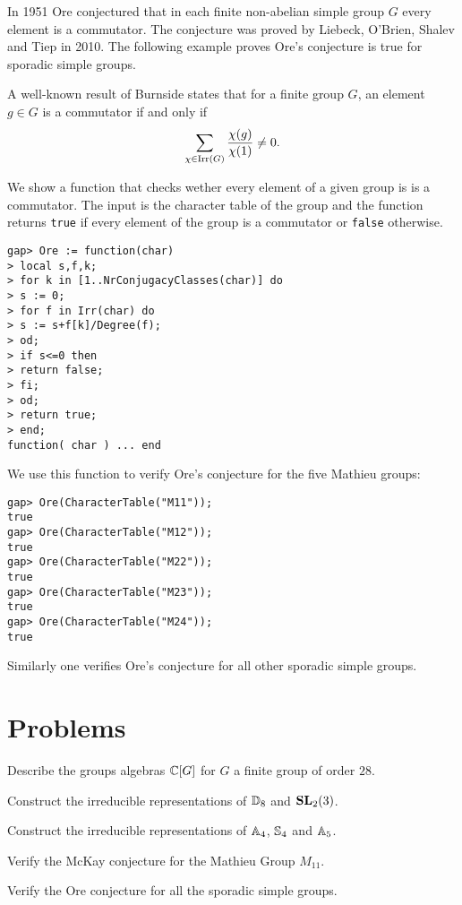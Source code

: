 In 1951 Ore conjectured that in each finite non-abelian simple group $G$ every element is a commutator. 
The conjecture was proved by Liebeck, O'Brien, Shalev and Tiep in 2010. The following example
proves 
Ore's conjecture is true
for sporadic simple groups. 

\begin{example}
A well-known result of Burnside states that 
for a finite group $G$, an element $g\in G$ is a commutator if and only if 
\[
\sum_{\chi\in\operatorname{Irr}(G)}\frac{\chi(g)}{\chi(1)}\ne 0.
\]

We show a function that checks wether every element of a given group is 
is a commutator. The input is the character table of the group and
the function returns \lstinline{true} if every element of the group is a commutator 
or \lstinline{false} otherwise. 
\begin{lstlisting}
gap> Ore := function(char) 
> local s,f,k;
> for k in [1..NrConjugacyClasses(char)] do
> s := 0;
> for f in Irr(char) do
> s := s+f[k]/Degree(f);  
> od;
> if s<=0 then
> return false;
> fi;
> od;
> return true;
> end;
function( char ) ... end
\end{lstlisting}

We use this function to verify Ore's conjecture for the five Mathieu groups:
\begin{lstlisting}
gap> Ore(CharacterTable("M11"));
true
gap> Ore(CharacterTable("M12"));
true
gap> Ore(CharacterTable("M22"));
true
gap> Ore(CharacterTable("M23"));
true
gap> Ore(CharacterTable("M24"));
true
\end{lstlisting}
Similarly one verifies Ore's conjecture for all other sporadic simple groups. 
\end{example}

\section{Problems}

\begin{prob}
	\label{prob:groupalgebra}
	Describe the groups algebras $\mathbb{C}[G]$ for $G$ a finite group of order $28$.
\end{prob}

\begin{prob}
	Construct the irreducible representations of $\mathbb{D}_8$ and $\mathbf{SL}_2(3)$.
\end{prob}

\begin{prob}
	Construct the irreducible representations of 
	$\mathbb{A}_4$, $\mathbb{S}_4$ and $\mathbb{A}_5$.
\end{prob}

\begin{prob}
	\label{prob:McKay:M11}
	Verify the McKay conjecture for the Mathieu Group $M_{11}$.
\end{prob}

\begin{prob}
	\label{prob:Ore}
	Verify the Ore conjecture for all the sporadic simple groups. 
\end{prob}

